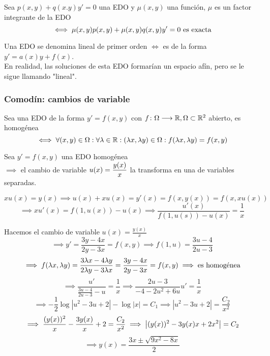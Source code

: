 \documentclass[12pt]{article}
\begin{document}
\begin{defn}
    Sea $p(x,y) + q(x.y)y'=0$ una EDO y $\mu(x,y)$ una función, $\mu$ es un factor integrante de la EDO
    \[\iff \mu(x,y)p(x,y)+\mu(x,y)q(x,y)y'=0 \text{ es exacta}\]
\end{defn}
\begin{defn}
    Una EDO se denomina lineal de primer orden $\iff$ es de la forma $y'=a(x)y+f(x)$. \\
    \indent En realidad, las soluciones de esta EDO formarían un espacio afín, pero se le sigue llamando "lineal".
\end{defn}
\subsubsection{Comodín: cambios de variable}
\begin{defn}
    Sea una EDO de la forma $y'=f(x,y)$ con $f \colon \Omega \longrightarrow \mathbb{R}, \Omega \subset \mathbb{R}^2$ abierto, es homogénea
    \[\iff \forall (x, y) \in \Omega : \forall \lambda\in \mathbb{R} : (\lambda x, \lambda y) \in \Omega : f(\lambda x, \lambda y) = f(x,y)\]
\end{defn}

\begin{prop}
    Sea $y'=f(x,y)$ una EDO homogénea \\
    $\implies$ el cambio de variable $\displaystyle u(x)=\frac{y(x)}{x}$ la transforma en una de variables separadas.
    \begin{dem}
        \[xu(x)=y(x) \implies u(x)+xu(x)=y'(x)=f(x, y(x))=f(x, xu(x))\]
        \[\implies xu'(x)=f(1, u(x))-u(x) \implies \frac{u'(x)}{f(1, u(s))-u(x)}=\frac{1}{x}\]
    \end{dem}
\end{prop}
\begin{ejem}[$4x-3y+y'(2y-3x)=0$]
    Hacemos el cambio de variable $u(x)=\frac{y(x)}{x}$
    \[\implies y'=\frac{3y-4x}{2y-3x}=f(x,y) \implies f(1, u)=\frac{3u-4}{2u-3}\]
    \[\implies f(\lambda x, \lambda y)=\frac{3\lambda x-4\lambda y}{2\lambda y-3\lambda x}=\frac{3y-4x}{2y-3x}=f(x,y) \implies \text{es homogénea}\]
    \[\implies \frac{u'}{\frac{3u-4}{2u-3}-u}=\frac{1}{x} \implies \frac{2u-3}{-4-2u^2+6u}u'=\frac{1}{x}\]
    \[\implies -\frac{1}{2}\log{|u^2-3u+2|}-\log{|x|}=C_1 \implies |u^2-3u+2|=\frac{C_2}{x^2}\]
    \[\implies \frac{(y(x))^2}{x}-\frac{3y(x)}{x}+2=\frac{C_2}{x^2} \implies \left|(y(x))^2-3y(x)x+2x^2\right|=C_2\]
    \[\implies \boxed{y(x)=\frac{3x\pm \sqrt{9x^2-8x}}{2}}\]
\end{ejem}
\end{document}
